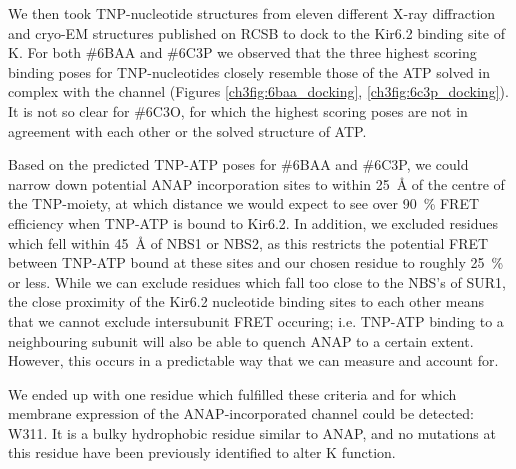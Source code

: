 We then took TNP-nucleotide structures from eleven different X-ray diffraction and cryo-EM structures published on RCSB to dock to the Kir6.2 binding site of K\ATP{}.
For both \#6BAA and \#6C3P we observed that the three highest scoring binding poses for TNP-nucleotides closely resemble those of the ATP solved in complex with the channel (Figures \ref{ch3fig:6baa_docking}, \ref{ch3fig:6c3p_docking}).
It is not so clear for \#6C3O, for which the highest scoring poses are not in agreement with each other or the solved structure of ATP.

Based on the predicted TNP-ATP poses for \#6BAA and \#6C3P, we could narrow down potential ANAP incorporation sites to within \SI{25}{\angstrom} of the centre of the TNP-moiety, at which distance we would expect to see over \SI{90}{\percent} FRET efficiency when TNP-ATP is bound to Kir6.2.
In addition, we excluded residues which fell within \SI{45}{\angstrom} of NBS1 or NBS2, as this restricts the potential FRET between TNP-ATP bound at these sites and our chosen residue to roughly \SI{25}{\percent} or less.
While we can exclude residues which fall too close to the NBS's of SUR1, the close proximity of the Kir6.2 nucleotide binding sites to each other means that we cannot exclude intersubunit FRET occuring; i.e. TNP-ATP binding to a neighbouring subunit will also be able to quench ANAP to a certain extent. However, this occurs in a predictable way that we can measure and account for.

We ended up with one residue which fulfilled these criteria and for which membrane expression of the ANAP-incorporated channel could be detected: W311.
It is a bulky hydrophobic residue similar to ANAP, and no mutations at this residue have been previously identified to alter K\ATP{} function.

